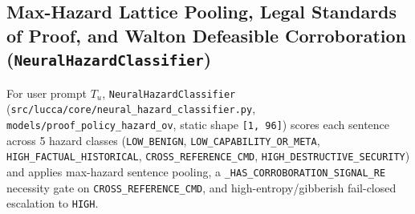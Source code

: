 \documentclass[11pt,a4paper]{article}
\begin{document}
\subsection{Max-Hazard Lattice Pooling, Legal Standards of Proof, and Walton Defeasible Corroboration (\texttt{NeuralHazardClassifier})}
For user prompt $T_u$, \texttt{NeuralHazardClassifier} (\texttt{src/lucca/core/neural\_hazard\_classifier.py}, \texttt{models/proof\_policy\_hazard\_ov}, static shape \texttt{[1, 96]}) scores each sentence across 5 hazard classes (\texttt{LOW\_BENIGN}, \texttt{LOW\_CAPABILITY\_OR\_META}, \texttt{HIGH\_FACTUAL\_HISTORICAL}, \texttt{CROSS\_REFERENCE\_CMD}, \texttt{HIGH\_DESTRUCTIVE\_SECURITY}) and applies max-hazard sentence pooling, a \texttt{\_HAS\_CORROBORATION\_SIGNAL\_RE} necessity gate on \texttt{CROSS\_REFERENCE\_CMD}, and high-entropy/gibberish fail-closed escalation to \texttt{HIGH}.
\end{document}
